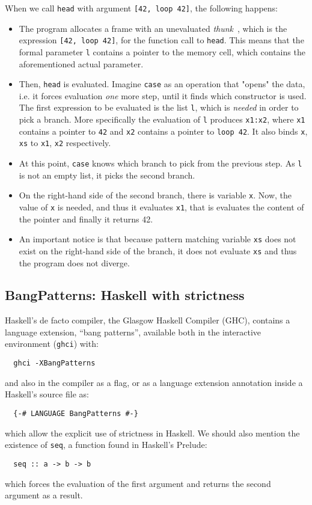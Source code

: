 \documentclass[diploma]{softlab-thesis}
\begin{document}
When we call \texttt{head} with argument \texttt{[42, loop 42]}, the following happens:
\begin {itemize}
  \item The program allocates a frame with an unevaluated \textit{thunk}~\cite{Bloss1988}, which is the expression \texttt{[42, loop 42]}, for the function call to \texttt{head}.
  This means that the formal parameter \texttt{l} contains a pointer to the memory cell, which contains the aforementioned actual parameter.
  \item Then, \texttt{head} is evaluated. Imagine \texttt{case} as an operation that "opens" the data, i.e. it forces evaluation \textit{one} 
  more step, until it finds which constructor is used. The first expression to be evaluated is the list \texttt{l}, which is \textit{needed} in order to pick a branch. More 
  specifically the evaluation of \texttt{l} produces \texttt{x1:x2}, where \texttt{x1} contains a pointer to \texttt{42} and \texttt{x2} contains a pointer to \texttt{loop 42}.
  It also binds \texttt{x}, \texttt{xs} to \texttt{x1}, \texttt{x2} respectively.
  \item At this point, \texttt{case} knows which branch to pick from the previous step. As \texttt{l} is not an empty list, it picks the 
  second branch. 
  \item On the right-hand side of the second branch, there is variable \texttt{x}. Now, the value of \texttt{x} is needed, and thus 
  it evaluates \texttt{x1}, that is evaluates the content of the pointer and finally it returns 42.
  \item An important notice is that because pattern matching variable \texttt{xs} does not exist on the right-hand side 
  of the branch, it does not evaluate \texttt{xs} and thus the program does not diverge.
\end{itemize}

\subsection{BangPatterns: Haskell with strictness}
\label{sec:bangpatterns}

Haskell's de facto compiler, the Glasgow Haskell Compiler (GHC),
contains a language extension, ``bang patterns'', available both in
the interactive environment (\texttt{ghci}) with:
\begin{verbatim}
  ghci -XBangPatterns
\end{verbatim}
and also in the compiler as a flag, or as a language extension annotation inside a Haskell's source file as:
\begin{verbatim}
  {-# LANGUAGE BangPatterns #-}
\end{verbatim}
which allow the explicit use of strictness in Haskell. We should also mention the existence of \texttt{seq}, a function found
in Haskell's Prelude:
\begin{verbatim}
  seq :: a -> b -> b
\end{verbatim}
which forces the evaluation of the first argument and returns the second argument as a result.
\end{document}
